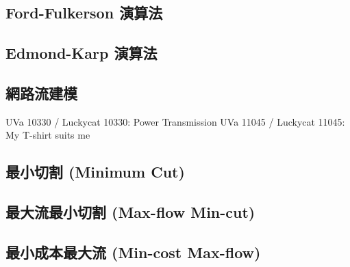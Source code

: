 \documentclass[12pt,a4paper,oneside]{report}
\begin{document}
\begin{CJK}{UTF8}{bkai}
\subsection{Ford-Fulkerson 演算法}
\subsection{Edmond-Karp 演算法}
\subsection{網路流建模}

UVa 10330 / Luckycat 10330: Power Transmission
UVa 11045 / Luckycat 11045: My T-shirt suits me

\subsection{最小切割 (Minimum Cut)}
\subsection{最大流最小切割 (Max-flow Min-cut)}
\subsection{最小成本最大流 (Min-cost Max-flow)}
\ifx \allfiles \undefined
\printindex[noun]

\clearpage
\end{CJK}
\end{document}
